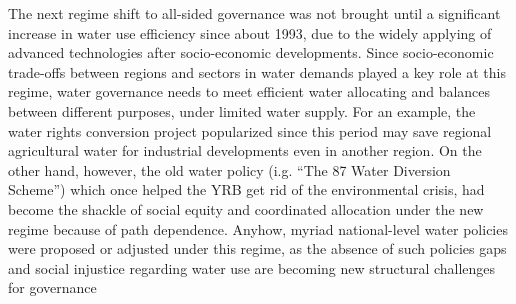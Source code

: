 \documentclass[9pt, twocolumn, twoside, lineno]{pnas-new}
\begin{document}
The next regime shift to all-sided governance was not brought until a significant increase in water use efficiency since about 1993, due to the widely applying of advanced technologies after socio-economic developments. 
Since socio-economic trade-offs between regions and sectors in water demands played a key role at this regime, water governance needs to meet efficient water allocating and balances between different purposes, under limited water supply.
For an example, the water rights conversion project popularized since this period may save regional agricultural water for industrial developments even in another region.
On the other hand, however, the old water policy (i.g. ``The 87 Water Diversion Scheme'') which once helped the YRB get rid of the environmental crisis, had become the shackle of social equity and coordinated allocation under the new regime because of path dependence.
Anyhow, myriad national-level water policies were proposed or adjusted under this regime, as the absence of such policies gaps and social injustice regarding water use are becoming new structural challenges for governance
\end{document}
